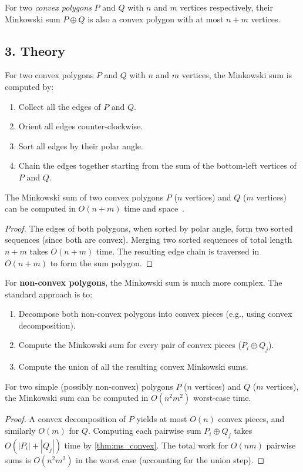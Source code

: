 \begin{definition}
\label{def:ms_convex}
For two \emph{convex polygons} $P$ and $Q$ with $n$ and $m$ vertices respectively, their Minkowski sum $P \oplus Q$ is also a convex polygon with at most $n + m$ vertices.
\end{definition}

\subsection{3. Theory}
For two convex polygons $P$ and $Q$ with $n$ and $m$ vertices, the Minkowski sum is computed by:
\begin{enumerate}
    \item Collect all the edges of $P$ and $Q$.
    \item Orient all edges counter-clockwise.
    \item Sort all edges by their polar angle.
    \item Chain the edges together starting from the sum of the bottom-left vertices of $P$ and $Q$.
\end{enumerate}

\begin{theorem}
\label{thm:ms_convex}
The Minkowski sum of two convex polygons $P$ ($n$ vertices) and $Q$ ($m$ vertices) can be computed in $O(n + m)$ time and space~\cite{guibas1987}.
\end{theorem}
\begin{proof}
The edges of both polygons, when sorted by polar angle, form two sorted sequences (since both are convex). Merging two sorted sequences of total length $n+m$ takes $O(n+m)$ time. The resulting edge chain is traversed in $O(n+m)$ to form the sum polygon.
\end{proof}

For \textbf{non-convex polygons}, the Minkowski sum is much more complex. The standard approach is to:
\begin{enumerate}
    \item Decompose both non-convex polygons into convex pieces (e.g., using convex decomposition).
    \item Compute the Minkowski sum for every pair of convex pieces ($P_i \oplus Q_j$).
    \item Compute the union of all the resulting convex Minkowski sums.
\end{enumerate}

\begin{theorem}
\label{thm:ms_nonconvex}
For two simple (possibly non-convex) polygons $P$ ($n$ vertices) and $Q$ ($m$ vertices), the Minkowski sum can be computed in $O(n^2 m^2)$ worst-case time.
\end{theorem}
\begin{proof}
A convex decomposition of $P$ yields at most $O(n)$ convex pieces, and similarly $O(m)$ for $Q$. Computing each pairwise sum $P_i \oplus Q_j$ takes $O(|P_i| + |Q_j|)$ time by \cref{thm:ms_convex}. The total work for $O(nm)$ pairwise sums is $O(n^2 m^2)$ in the worst case (accounting for the union step).
\end{proof}

